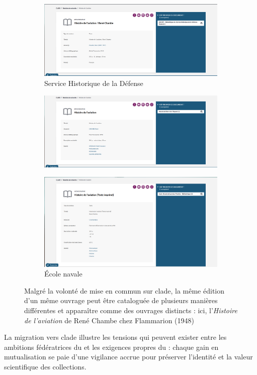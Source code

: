 \begin{figure}[htbp]
	\centering
	\begin{subfigure}{0.7\textwidth}
		\centering
		\includegraphics[width=\linewidth]{img/IMG_clade_histoireaviation_shdTL}
		\caption{Service Historique de la Défense}
		\label{img:cladehistoireaviationshdtl}
	\end{subfigure}
	\begin{subfigure}{0.7\textwidth}
		\centering
		\includegraphics[width=\linewidth]{img/IMG_clade_histoireaviation_mae}
		\caption{\mae}
		\label{img:cladehistoireaviationsmae}
	\end{subfigure}
	\hfill
	\begin{subfigure}{0.7\textwidth}
		\centering
		\includegraphics[width=\linewidth]{img/IMG_clade_histoireaviation_navale}
		\caption{École navale}
		\label{img:cladehistoireaviationnavale}
	\end{subfigure}
	\caption[Différences de catalogage entre les \bibmusee sur \ac{clade}]{Malgré la volonté de mise en commun sur \ac{clade}, la même édition d'un même ouvrage peut être cataloguée de plusieurs manières différentes et apparaître comme des ouvrages distincts : ici, l'\textit{Histoire de l'aviation} de René Chambe chez Flammarion (1948)}
	\label{fig:clade_histoaviation}
\end{figure}


La migration vers \gls{clade} illustre les tensions qui peuvent exister entre les ambitions fédératrices du \minarm et les exigences propres du \mae : chaque gain en mutualisation se paie d’une vigilance accrue pour préserver l’identité et la valeur scientifique des collections.
